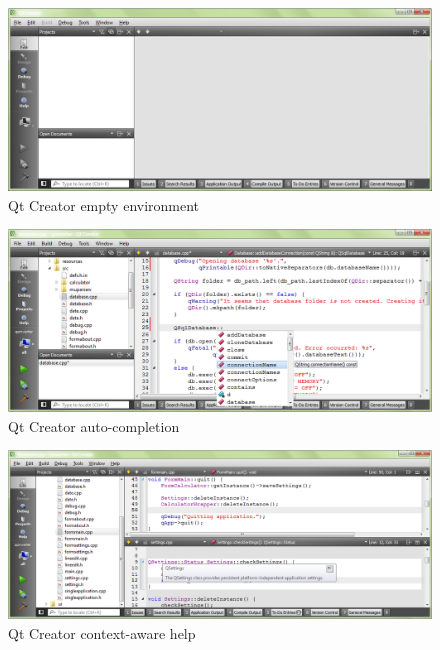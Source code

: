 \begin{figure}[ht]
\centering
\includegraphics[width=14.5cm]{graphics/laboratory/03-qtcreator.png}
\caption{Qt Creator empty environment}\label{figure:qtcreator}
\end{figure}

\begin{figure}[ht]
\centering
\includegraphics[width=14.5cm]{graphics/laboratory/04-qtcreator-auto.png}
\caption{Qt Creator auto-completion}\label{figure:qtcreatorauto}
\end{figure}

\begin{figure}[ht]
\centering
\includegraphics[width=14.5cm]{graphics/laboratory/05-qtcreator-help.png}
\caption{Qt Creator context-aware help}\label{figure:qtcreatorhelp}
\end{figure}

